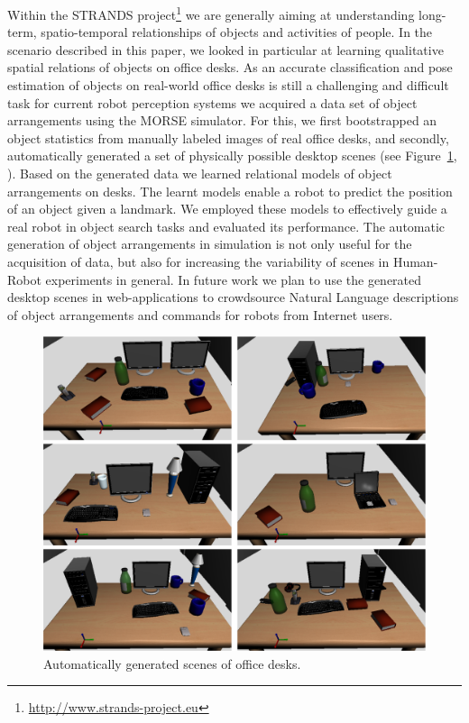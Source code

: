 \documentclass[conference]{IEEEtran}
\begin{document}
Within the STRANDS project\footnote{\url{http://www.strands-project.eu}} we are
generally aiming at understanding long-term, spatio-temporal relationships of
objects and activities of people. In the scenario described in this paper, we
looked in particular at learning qualitative spatial relations of objects on
office desks. As an accurate classification and pose estimation of objects on
real-world office desks is still a challenging and difficult task for current
robot perception systems we acquired a data set of object arrangements using
the MORSE simulator. For this, we first bootstrapped an object statistics from
manually labeled images of real office desks, and secondly, automatically
generated a set of physically possible desktop scenes (see
Figure~\ref{fig:simulated-desktop-scenes}, \cite{kunze14bootstrapping}). Based
on the generated data we learned relational models of object arrangements on
desks. The learnt models enable a robot to predict the position of an object
given a landmark. We employed these models to effectively guide a real robot in
object search tasks \cite{kunze14indirect} and evaluated its performance. The
automatic generation of object arrangements in simulation is not only useful
for the acquisition of data, but also for increasing the variability of scenes
in Human-Robot experiments in general. In future work we plan to use the
generated desktop scenes in web-applications to crowdsource Natural Language
descriptions of object arrangements and commands for robots from Internet
users.

\begin{figure}[tb]
  \centering
  \includegraphics[width=.9\columnwidth]{figs/scenes.png}
  \caption{Automatically generated scenes of office desks.}
  \label{fig:simulated-desktop-scenes}
\end{figure}
\end{document}
